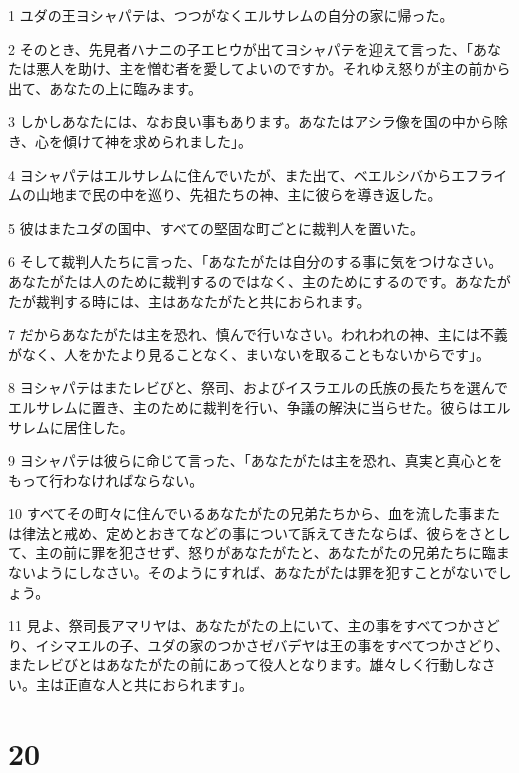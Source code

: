 \par 1 ユダの王ヨシャパテは、つつがなくエルサレムの自分の家に帰った。
\par 2 そのとき、先見者ハナニの子エヒウが出てヨシャパテを迎えて言った、「あなたは悪人を助け、主を憎む者を愛してよいのですか。それゆえ怒りが主の前から出て、あなたの上に臨みます。
\par 3 しかしあなたには、なお良い事もあります。あなたはアシラ像を国の中から除き、心を傾けて神を求められました」。
\par 4 ヨシャパテはエルサレムに住んでいたが、また出て、ベエルシバからエフライムの山地まで民の中を巡り、先祖たちの神、主に彼らを導き返した。
\par 5 彼はまたユダの国中、すべての堅固な町ごとに裁判人を置いた。
\par 6 そして裁判人たちに言った、「あなたがたは自分のする事に気をつけなさい。あなたがたは人のために裁判するのではなく、主のためにするのです。あなたがたが裁判する時には、主はあなたがたと共におられます。
\par 7 だからあなたがたは主を恐れ、慎んで行いなさい。われわれの神、主には不義がなく、人をかたより見ることなく、まいないを取ることもないからです」。
\par 8 ヨシャパテはまたレビびと、祭司、およびイスラエルの氏族の長たちを選んでエルサレムに置き、主のために裁判を行い、争議の解決に当らせた。彼らはエルサレムに居住した。
\par 9 ヨシャパテは彼らに命じて言った、「あなたがたは主を恐れ、真実と真心とをもって行わなければならない。
\par 10 すべてその町々に住んでいるあなたがたの兄弟たちから、血を流した事または律法と戒め、定めとおきてなどの事について訴えてきたならば、彼らをさとして、主の前に罪を犯させず、怒りがあなたがたと、あなたがたの兄弟たちに臨まないようにしなさい。そのようにすれば、あなたがたは罪を犯すことがないでしょう。
\par 11 見よ、祭司長アマリヤは、あなたがたの上にいて、主の事をすべてつかさどり、イシマエルの子、ユダの家のつかさゼバデヤは王の事をすべてつかさどり、またレビびとはあなたがたの前にあって役人となります。雄々しく行動しなさい。主は正直な人と共におられます」。

\chapter{20}

